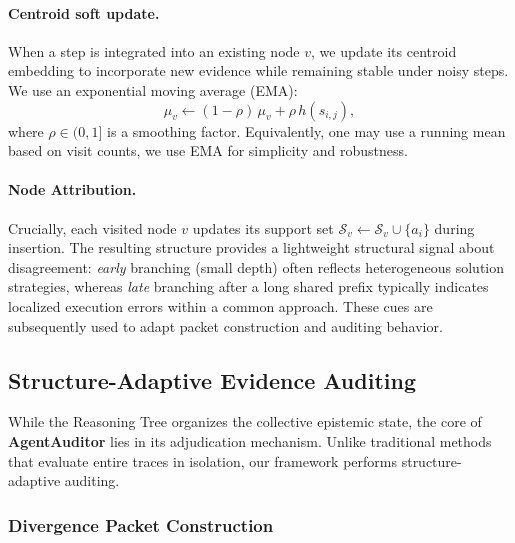\documentclass{article}
\theoremstyle{plain}
\theoremstyle{definition}
\theoremstyle{remark}
\begin{document}
\paragraph{Centroid soft update.}
When a step is integrated into an existing node $v$, we update its centroid embedding to incorporate new evidence while remaining stable under noisy steps. We use an exponential moving average (EMA):
\begin{equation}
    {\mu}_v \leftarrow (1-\rho)\,{\mu}_v + \rho\,{h}(s_{i,j}),
\end{equation}
where $\rho\in(0,1]$ is a smoothing factor. Equivalently, one may use a running mean based on visit counts, we use EMA for simplicity and robustness.

\paragraph{Node Attribution.}
Crucially, each visited node $v$ updates its support set $\mathcal{S}_v \leftarrow \mathcal{S}_v \cup \{a_i\}$ during insertion. The resulting structure provides a lightweight structural signal about disagreement: \emph{early} branching (small depth) often reflects heterogeneous solution strategies, whereas \emph{late} branching after a long shared prefix typically indicates localized execution errors within a common approach. These cues are subsequently used to adapt packet construction and auditing behavior.



\subsection{Structure-Adaptive Evidence Auditing}
\label{sec:auditing}

While the Reasoning Tree organizes the collective epistemic state, the core of \textbf{AgentAuditor} lies in its adjudication mechanism. Unlike traditional methods that evaluate entire traces in isolation, our framework performs structure-adaptive auditing. 

\subsubsection{Divergence Packet Construction}
\label{sec:packet}
\end{document}
